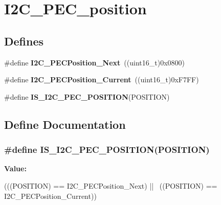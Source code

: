 \hypertarget{group__I2C__PEC__position}{
\section{I2C\_\-PEC\_\-position}
\label{group__I2C__PEC__position}
}
\subsection*{Defines}
\begin{DoxyCompactItemize}
\item 
\hypertarget{group__I2C__PEC__position_ga74d0996efe6e278fb28d053ba78fccc5}{
\#define {\bfseries I2C\_\-PECPosition\_\-Next}~((uint16\_\-t)0x0800)}
\label{group__I2C__PEC__position_ga74d0996efe6e278fb28d053ba78fccc5}

\item 
\hypertarget{group__I2C__PEC__position_ga8a393364dd651f88bcaebac71c1c52c7}{
\#define {\bfseries I2C\_\-PECPosition\_\-Current}~((uint16\_\-t)0xF7FF)}
\label{group__I2C__PEC__position_ga8a393364dd651f88bcaebac71c1c52c7}

\item 
\#define {\bfseries IS\_\-I2C\_\-PEC\_\-POSITION}(POSITION)
\end{DoxyCompactItemize}


\subsection{Define Documentation}
\hypertarget{group__I2C__PEC__position_gac8611a62b06256b1b3c60d4859a016ef}{
\subsubsection[{IS\_\-I2C\_\-PEC\_\-POSITION}]{\setlength{\rightskip}{0pt plus 5cm}\#define IS\_\-I2C\_\-PEC\_\-POSITION(POSITION)}}
\label{group__I2C__PEC__position_gac8611a62b06256b1b3c60d4859a016ef}
{\bfseries Value:}
\begin{DoxyCode}
(((POSITION) == I2C_PECPosition_Next) || \
                                       ((POSITION) == I2C_PECPosition_Current))
\end{DoxyCode}
